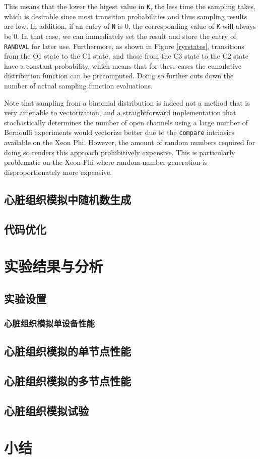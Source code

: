 This means that the lower the higest value in {\tt K}, the less time the sampling takes, which is desirable since most transition probabilities and thus sampling results are low. In addition, if an entry of {\tt N} is $0$, the corresponding value of {\tt K} will always be $0$. In that case, we can immediately set the result and store the entry of {\tt RANDVAL} for later use. Furthermore, as shown in Figure \ref{ryrstates}, transitions from the O1 state to the C1 state, and those from the C3 state to the C2 state have a constant probability, which means that for these cases the cumulative distribution function can be precomputed. Doing so further cuts down the number of actual sampling function evaluations.

Note that sampling from a binomial distribution is indeed not a method that is very amenable to vectorization, and a straightforward implementation that stochastically determines the number of open channels using a large number of Bernoulli experiments would vectorize better due to the \texttt{compare} intrinsics available on the Xeon Phi. However, the amount of random numbers required for doing so renders this approach prohibitively expensive. This is particularly problematic on the Xeon Phi where random number generation is disproportionately more expensive. 

\subsection{心脏组织模拟中随机数生成}


\subsection{代码优化}



\section{实验结果与分析}
\subsection{实验设置}

\subsubsection{心脏组织模拟单设备性能}

\subsection{心脏组织模拟的单节点性能}

\subsection{心脏组织模拟的多节点性能}

\subsection{心脏组织模拟试验}

\section{小结}
